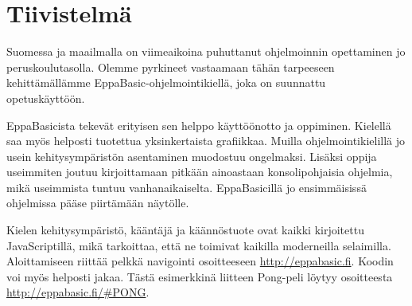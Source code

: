 
\section*{Tiivistelmä}
Suomessa ja maailmalla on viimeaikoina puhuttanut
ohjelmoinnin opettaminen jo peruskoulutasolla.
Olemme pyrkineet vastaamaan tähän tarpeeseen
kehittämällämme EppaBasic-ohjelmointikiellä, joka
on suunnattu opetuskäyttöön.

EppaBasicista tekevät erityisen sen helppo käyttöönotto
ja oppiminen. Kielellä saa myös helposti tuotettua
yksinkertaista grafiikkaa. Muilla ohjelmointikielillä
jo usein kehitysympäristön asentaminen muodostuu ongelmaksi.
Lisäksi oppija useimmiten joutuu kirjoittamaan pitkään
ainoastaan konsolipohjaisia ohjelmia, mikä useimmista
tuntuu vanhanaikaiselta. EppaBasicillä jo ensimmäisissä
ohjelmissa pääse piirtämään näytölle.

Kielen kehitysympäristö, kääntäjä ja käännöstuote ovat
kaikki kirjoitettu JavaScriptillä, mikä tarkoittaa, että
ne toimivat kaikilla moderneilla selaimilla. Aloittamiseen
riittää pelkkä navigointi osoitteeseen \url{http://eppabasic.fi}.
Koodin voi myös helposti jakaa. Tästä esimerkkinä liitteen
Pong-peli löytyy osoitteesta \url{http://eppabasic.fi/#PONG}.
